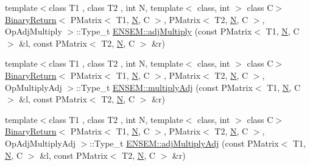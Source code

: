 \begin{DoxyCompactItemize}
\item 
{\footnotesize template$<$class T1 , class T2 , int N, template$<$ class, int $>$ class C$>$ }\\\mbox{\hyperlink{structBinaryReturn}{Binary\+Return}}$<$ P\+Matrix$<$ T1, \mbox{\hyperlink{adat__devel_2lib_2hadron_2operator__name__util_8cc_a7722c8ecbb62d99aee7ce68b1752f337}{N}}, C $>$, P\+Matrix$<$ T2, \mbox{\hyperlink{adat__devel_2lib_2hadron_2operator__name__util_8cc_a7722c8ecbb62d99aee7ce68b1752f337}{N}}, C $>$, Op\+Adj\+Multiply $>$\+::Type\+\_\+t \mbox{\hyperlink{group__primmatrix_gac28cbe7440b96e5650ac2c201b8c5ac2}{E\+N\+S\+E\+M\+::adj\+Multiply}} (const P\+Matrix$<$ T1, \mbox{\hyperlink{adat__devel_2lib_2hadron_2operator__name__util_8cc_a7722c8ecbb62d99aee7ce68b1752f337}{N}}, C $>$ \&l, const P\+Matrix$<$ T2, \mbox{\hyperlink{adat__devel_2lib_2hadron_2operator__name__util_8cc_a7722c8ecbb62d99aee7ce68b1752f337}{N}}, C $>$ \&r)
\item 
{\footnotesize template$<$class T1 , class T2 , int N, template$<$ class, int $>$ class C$>$ }\\\mbox{\hyperlink{structBinaryReturn}{Binary\+Return}}$<$ P\+Matrix$<$ T1, \mbox{\hyperlink{adat__devel_2lib_2hadron_2operator__name__util_8cc_a7722c8ecbb62d99aee7ce68b1752f337}{N}}, C $>$, P\+Matrix$<$ T2, \mbox{\hyperlink{adat__devel_2lib_2hadron_2operator__name__util_8cc_a7722c8ecbb62d99aee7ce68b1752f337}{N}}, C $>$, Op\+Multiply\+Adj $>$\+::Type\+\_\+t \mbox{\hyperlink{group__primmatrix_gaf37104443218a1cbaa8ab848065a0a09}{E\+N\+S\+E\+M\+::multiply\+Adj}} (const P\+Matrix$<$ T1, \mbox{\hyperlink{adat__devel_2lib_2hadron_2operator__name__util_8cc_a7722c8ecbb62d99aee7ce68b1752f337}{N}}, C $>$ \&l, const P\+Matrix$<$ T2, \mbox{\hyperlink{adat__devel_2lib_2hadron_2operator__name__util_8cc_a7722c8ecbb62d99aee7ce68b1752f337}{N}}, C $>$ \&r)
\item 
{\footnotesize template$<$class T1 , class T2 , int N, template$<$ class, int $>$ class C$>$ }\\\mbox{\hyperlink{structBinaryReturn}{Binary\+Return}}$<$ P\+Matrix$<$ T1, \mbox{\hyperlink{adat__devel_2lib_2hadron_2operator__name__util_8cc_a7722c8ecbb62d99aee7ce68b1752f337}{N}}, C $>$, P\+Matrix$<$ T2, \mbox{\hyperlink{adat__devel_2lib_2hadron_2operator__name__util_8cc_a7722c8ecbb62d99aee7ce68b1752f337}{N}}, C $>$, Op\+Adj\+Multiply\+Adj $>$\+::Type\+\_\+t \mbox{\hyperlink{group__primmatrix_ga81c788e54ea0f4c4de97e7bfa9d7cd89}{E\+N\+S\+E\+M\+::adj\+Multiply\+Adj}} (const P\+Matrix$<$ T1, \mbox{\hyperlink{adat__devel_2lib_2hadron_2operator__name__util_8cc_a7722c8ecbb62d99aee7ce68b1752f337}{N}}, C $>$ \&l, const P\+Matrix$<$ T2, \mbox{\hyperlink{adat__devel_2lib_2hadron_2operator__name__util_8cc_a7722c8ecbb62d99aee7ce68b1752f337}{N}}, C $>$ \&r)

\end{DoxyCompactItemize}
